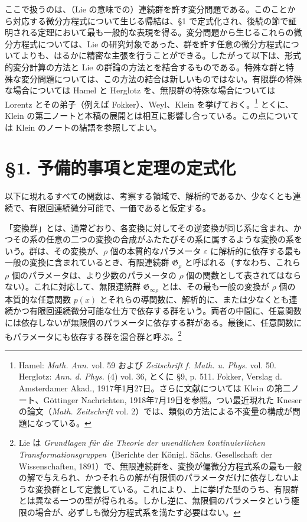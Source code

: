 \documentclass[11pt]{article}
\newcommand{\eps}{\varepsilon}
\providecommand{\G}{\mathfrak G}
\begin{document}
ここで扱うのは、（Lie の意味での）連続群を許す変分問題である。このことから対応する微分方程式について生じる帰結は、\S{}1 で定式化され、後続の節で証明される定理において最も一般的な表現を得る。変分問題から生じるこれらの微分方程式については、Lie の研究対象であった、群を許す任意の微分方程式についてよりも、はるかに精密な主張を行うことができる。したがって以下は、形式的変分計算の方法と Lie の群論の方法とを結合するものである。特殊な群と特殊な変分問題については、この方法の結合は新しいものではない。有限群の特殊な場合については Hamel と Herglotz を、無限群の特殊な場合については Lorentz とその弟子（例えば Fokker）、Weyl、Klein を挙げておく。\footnote{Hamel: \emph{Math. Ann.} vol. 59 および \emph{Zeitschrift f. Math. u. Phys.} vol. 50. Herglotz: \emph{Ann. d. Phys.} (4) vol. 36, とくに \S{}9, p. 511. Fokker, Verslag d. Amsterdamer Akad., 1917年1月27日。さらに文献については Klein の第二ノート、Göttinger Nachrichten, 1918年7月19日を参照。つい最近現れた Kneser の論文（\emph{Math. Zeitschrift} vol. 2）では、類似の方法による不変量の構成が問題になっている。} とくに、Klein の第二ノートと本稿の展開とは相互に影響し合っている。この点については Klein のノートの結語を参照してよい。

\section*{\S{}1. 予備的事項と定理の定式化}

以下に現れるすべての関数は、考察する領域で、解析的であるか、少なくとも連続で、有限回連続微分可能で、一価であると仮定する。

「変換群」とは、通常どおり、各変換に対してその逆変換が同じ系に含まれ、かつその系の任意の二つの変換の合成がふたたびその系に属するような変換の系をいう。群は、その変換が、\(\rho\) 個の本質的なパラメータ \(\eps\) に解析的に依存する最も一般の変換に含まれているとき、有限連続群 \(\G_\rho\) と呼ばれる（すなわち、これら \(\rho\) 個のパラメータは、より少数のパラメータの \(\rho\) 個の関数として表されてはならない）。これに対応して、無限連続群 \(\G_{\infty\rho}\) とは、その最も一般の変換が \(\rho\) 個の本質的な任意関数 \(p(x)\) とそれらの導関数に、解析的に、または少なくとも連続かつ有限回連続微分可能な仕方で依存する群をいう。両者の中間に、任意関数には依存しないが無限個のパラメータに依存する群がある。最後に、任意関数にもパラメータにも依存する群を混合群と呼ぶ。\footnote{Lie は \emph{Grundlagen für die Theorie der unendlichen kontinuierlichen Transformationsgruppen}（Berichte der Königl. Sächs. Gesellschaft der Wissenschaften, 1891）で、無限連続群を、変換が偏微分方程式系の最も一般の解で与えられ、かつそれらの解が有限個のパラメータだけに依存しないような変換群として定義している。これにより、上に挙げた型のうち、有限群とは異なる一つの型が得られる。しかし逆に、無限個のパラメータという極限の場合が、必ずしも微分方程式系を満たす必要はない。}
\end{document}
